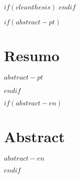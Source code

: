 




$if(cleanthesis)$
\clearpage
\customtitlebackpage
$endif$



$if(abstract-pt)$
\cleardoublepage
\begin{minipage}{\linewidth}

\chapter*{Resumo}
$abstract-pt$

\end{minipage}
$endif$

$if(abstract-en)$
\begin{minipage}{\linewidth}

\chapter*{Abstract}
$abstract-en$

\end{minipage}
\cleardoublepage
$endif$


